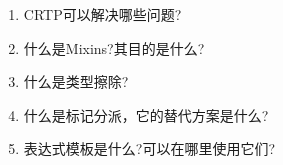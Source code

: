 \begin{enumerate}
\item
CRTP可以解决哪些问题?

\item
什么是Mixins?其目的是什么?

\item
什么是类型擦除?

\item
什么是标记分派，它的替代方案是什么?

\item
表达式模板是什么?可以在哪里使用它们?
\end{enumerate}